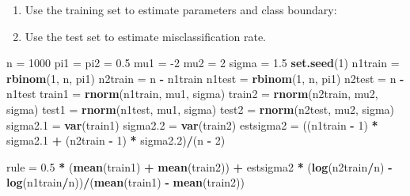 \documentclass[10pt,ignorenonframetext,]{beamer}
\newenvironment{Shaded}{\begin{snugshade}}{\end{snugshade}}
\newcommand{\KeywordTok}[1]{\textcolor[rgb]{0.13,0.29,0.53}{\textbf{#1}}}
\newcommand{\DecValTok}[1]{\textcolor[rgb]{0.00,0.00,0.81}{#1}}
\newcommand{\FloatTok}[1]{\textcolor[rgb]{0.00,0.00,0.81}{#1}}
\newcommand{\StringTok}[1]{\textcolor[rgb]{0.31,0.60,0.02}{#1}}
\newcommand{\OperatorTok}[1]{\textcolor[rgb]{0.81,0.36,0.00}{\textbf{#1}}}
\newcommand{\NormalTok}[1]{#1}
\providecommand{\tightlist}{%
  \setlength{\itemsep}{0pt}\setlength{\parskip}{0pt}}
\begin{document}
\begin{frame}[fragile]

\begin{enumerate}
\def\labelenumi{\arabic{enumi}.}
\tightlist
\item
  Use the training set to estimate parameters and class boundary:
\item
  Use the test set to estimate misclassification rate.
\end{enumerate}

\footnotesize

\begin{Shaded}
\begin{Highlighting}[]
\NormalTok{n =}\StringTok{ }\DecValTok{1000}
\NormalTok{pi1 =}\StringTok{ }\NormalTok{pi2 =}\StringTok{ }\FloatTok{0.5}
\NormalTok{mu1 =}\StringTok{ }\DecValTok{-2}
\NormalTok{mu2 =}\StringTok{ }\DecValTok{2}
\NormalTok{sigma =}\StringTok{ }\FloatTok{1.5}
\KeywordTok{set.seed}\NormalTok{(}\DecValTok{1}\NormalTok{)}
\NormalTok{n1train =}\StringTok{ }\KeywordTok{rbinom}\NormalTok{(}\DecValTok{1}\NormalTok{, n, pi1)}
\NormalTok{n2train =}\StringTok{ }\NormalTok{n }\OperatorTok{-}\StringTok{ }\NormalTok{n1train}
\NormalTok{n1test =}\StringTok{ }\KeywordTok{rbinom}\NormalTok{(}\DecValTok{1}\NormalTok{, n, pi1)}
\NormalTok{n2test =}\StringTok{ }\NormalTok{n }\OperatorTok{-}\StringTok{ }\NormalTok{n1test}
\NormalTok{train1 =}\StringTok{ }\KeywordTok{rnorm}\NormalTok{(n1train, mu1, sigma)}
\NormalTok{train2 =}\StringTok{ }\KeywordTok{rnorm}\NormalTok{(n2train, mu2, sigma)}
\NormalTok{test1 =}\StringTok{ }\KeywordTok{rnorm}\NormalTok{(n1test, mu1, sigma)}
\NormalTok{test2 =}\StringTok{ }\KeywordTok{rnorm}\NormalTok{(n2test, mu2, sigma)}
\NormalTok{sigma2}\FloatTok{.1}\NormalTok{ =}\StringTok{ }\KeywordTok{var}\NormalTok{(train1)}
\NormalTok{sigma2}\FloatTok{.2}\NormalTok{ =}\StringTok{ }\KeywordTok{var}\NormalTok{(train2)}
\NormalTok{estsigma2 =}\StringTok{ }\NormalTok{((n1train }\OperatorTok{-}\StringTok{ }\DecValTok{1}\NormalTok{) }\OperatorTok{*}\StringTok{ }\NormalTok{sigma2}\FloatTok{.1} \OperatorTok{+}\StringTok{ }\NormalTok{(n2train }\OperatorTok{-}\StringTok{ }\DecValTok{1}\NormalTok{) }\OperatorTok{*}\StringTok{ }\NormalTok{sigma2}\FloatTok{.2}\NormalTok{)}\OperatorTok{/}\NormalTok{(n }\OperatorTok{-}\StringTok{ }
\StringTok{    }\DecValTok{2}\NormalTok{)}

\NormalTok{rule =}\StringTok{ }\FloatTok{0.5} \OperatorTok{*}\StringTok{ }\NormalTok{(}\KeywordTok{mean}\NormalTok{(train1) }\OperatorTok{+}\StringTok{ }\KeywordTok{mean}\NormalTok{(train2)) }\OperatorTok{+}\StringTok{ }\NormalTok{estsigma2 }\OperatorTok{*}\StringTok{ }\NormalTok{(}\KeywordTok{log}\NormalTok{(n2train}\OperatorTok{/}\NormalTok{n) }\OperatorTok{-}\StringTok{ }
\StringTok{    }\KeywordTok{log}\NormalTok{(n1train}\OperatorTok{/}\NormalTok{n))}\OperatorTok{/}\NormalTok{(}\KeywordTok{mean}\NormalTok{(train1) }\OperatorTok{-}\StringTok{ }\KeywordTok{mean}\NormalTok{(train2))}


\end{Highlighting}
\end{Shaded}
\end{frame}
\end{document}
